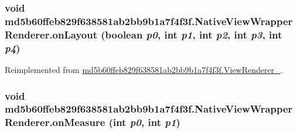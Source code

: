 \hypertarget{classmd5b60ffeb829f638581ab2bb9b1a7f4f3f_1_1_native_view_wrapper_renderer_428463947529e7fd1d164b52f9d54d56}{
\subsubsection[{onLayout}]{\setlength{\rightskip}{0pt plus 5cm}void md5b60ffeb829f638581ab2bb9b1a7f4f3f.NativeViewWrapperRenderer.onLayout (boolean {\em p0}, \/  int {\em p1}, \/  int {\em p2}, \/  int {\em p3}, \/  int {\em p4})}}
\label{classmd5b60ffeb829f638581ab2bb9b1a7f4f3f_1_1_native_view_wrapper_renderer_428463947529e7fd1d164b52f9d54d56}




Reimplemented from \hyperlink{classmd5b60ffeb829f638581ab2bb9b1a7f4f3f_1_1_view_renderer__2_0b758be41e41d3577cadf82bc8d004b6}{md5b60ffeb829f638581ab2bb9b1a7f4f3f.ViewRenderer\_}.\hypertarget{classmd5b60ffeb829f638581ab2bb9b1a7f4f3f_1_1_native_view_wrapper_renderer_83a4564a9f543507b77196fd2c440f12}{
\subsubsection[{onMeasure}]{\setlength{\rightskip}{0pt plus 5cm}void md5b60ffeb829f638581ab2bb9b1a7f4f3f.NativeViewWrapperRenderer.onMeasure (int {\em p0}, \/  int {\em p1})}}
\label{classmd5b60ffeb829f638581ab2bb9b1a7f4f3f_1_1_native_view_wrapper_renderer_83a4564a9f543507b77196fd2c440f12}




